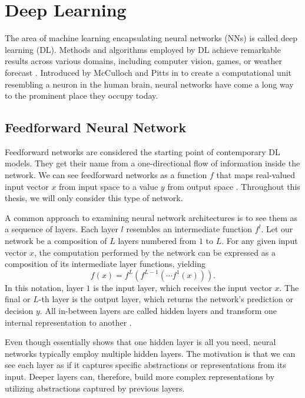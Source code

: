 \section{Deep Learning}\label{section:dl}

The area of machine learning encapsulating neural networks (NNs) is called deep learning (DL).
Methods and algorithms employed by DL achieve remarkable results across various domains, including computer vision, games, or weather forecast \cite{alexnet, alphago, weather}.
Introduced by McCulloch and Pitts in \cite{mcculloch-pitts} to create a computational unit resembling a neuron in the human brain, neural networks have come a long way to the prominent place they occupy today.

\subsection*{Feedforward Neural Network}\label{feedforward-nn}

Feedforward networks are considered the starting point of contemporary DL models.
They get their name from a one-directional flow of information inside the network.
We can see feedforward networks as a function $f$ that maps real-valued input vector $x$ from input space to a value $y$ from output space \cite{goodfellow}.
Throughout this thesis, we will only consider this type of network.

A common approach to examining neural network architectures is to see them as a sequence of layers.
Each layer $l$ resembles an intermediate function $f^l$.
Let our network be a composition of $L$ layers numbered from $1$ to $L$.
For any given input vector $x$, the computation performed by the network can be expressed as a composition of its intermediate layer functions, yielding
\begin{equation}
    f(x) = f^L(f^{L-1}(\cdots f^1(x))).
\end{equation}
In this notation, layer $1$ is the input layer, which receives the input vector $x$. The final or $L$-th layer is the output layer, which returns the network's prediction or decision $y$. All in-between layers are called hidden layers and transform one internal representation to another \cite{goodfellow}.

Even though \cite{cybenko} essentially shows that one hidden layer is all you need, neural networks typically employ multiple hidden layers.
The motivation is that we can see each layer as if it captures specific abstractions or representations from its input.
Deeper layers can, therefore, build more complex representations by utilizing abstractions captured by previous layers.

